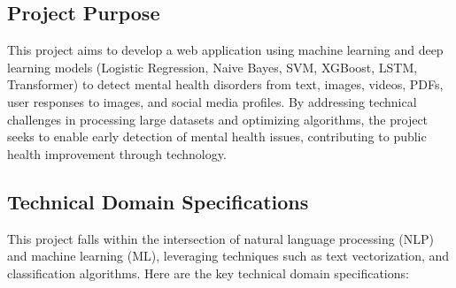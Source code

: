 \subsection{Project Purpose}
\vspace{.1in}
\noindent
This project aims to develop a web application using machine learning and deep learning models (Logistic Regression, Naive Bayes, SVM, XGBoost, LSTM, Transformer) to detect mental health disorders from text, images, videos, PDFs, user responses to images, and social media profiles. By addressing technical challenges in processing large datasets and optimizing algorithms, the project seeks to enable early detection of mental health issues, contributing to public health improvement through technology.

\subsection{Technical Domain Specifications}
\vspace{.1in}
This project falls within the intersection of natural language processing (NLP) and machine learning (ML), leveraging techniques such as text vectorization, and classification algorithms. Here are the key technical domain specifications:

\newpage

